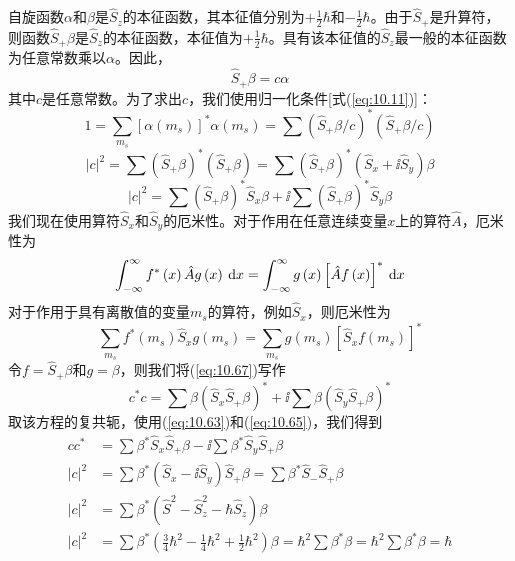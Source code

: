     自旋函数$\alpha$和$\beta$是$\hat{S}_z$的本征函数，其本征值分别为$+\frac{1}{2}\hbar$和$-\frac{1}{2}\hbar$。由于$\hat{S}_+$是升算符，则函数$\hat{S}_+\beta$是$\hat{S}_z$的本征函数，本征值为$+\frac{1}{2}\hbar$。具有该本征值的$\hat{S}_z$最一般的本征函数为任意常数乘以$\alpha$。因此，
    \begin{equation}
        \hat{S}_+\beta = c\alpha
        \label{eq:10.66}
    \end{equation}
    其中$c$是任意常数。为了求出$c$，我们使用归一化条件[式(\ref{eq:10.11})]：
    \begin{equation*}
        1 = \sum_{m_s} \left[\alpha\left(m_s\right)\right]^*\alpha\left(m_s\right) = \sum \left(\hat{S}_+\beta/c\right)^* \left(\hat{S}_+\beta/c\right)
    \end{equation*}
    \begin{equation*}
        \left|c\right|^2 = \sum \left(\hat{S}_+\beta\right) ^* \left(\hat{S}_+\beta\right) = \sum \left(\hat{S}_+\beta\right)^* \left(\hat{S}_x + \ii \hat{S}_y\right)\beta
    \end{equation*}
    \begin{equation}
        \left|c\right|^2 = \sum \left(\hat{S}_+\beta\right)^* \hat{S}_x\beta + \ii \sum \left(\hat{S}_+\beta\right)^* \hat{S}_y\beta
        \label{eq:10.67}
    \end{equation}
    我们现在使用算符$\hat{S}_x$和$\hat{S}_y$的厄米性。对于作用在任意连续变量$x$上的算符$\hat{A}$，厄米性为
    \begin{equation*}
        \int_{-\infty}^{\infty} f^*\left(x\right)\hat{A}g\left(x\right) \: \dd x = \int_{-\infty}^{\infty} g\left(x\right) \left[\hat{A}f\left(x\right)\right]^* \: \dd x
    \end{equation*}
    对于作用于具有离散值的变量$m_s$的算符，例如$\hat{S}_x$，则厄米性为
    \begin{equation}
        \sum_{m_s} f^*(m_s)\hat{S}_x g(m_s) = \sum_{m_s} g(m_s)\left[\hat{S}_x f(m_s)\right]^*
        \label{eq:10.68}
    \end{equation}
    令$f = \hat{S}_+\beta$和$g = \beta$，则我们将(\ref{eq:10.67})写作
    \begin{equation*}
        c ^* c = \sum \beta (\hat{S}_x\hat{S}_+ \beta) ^* + \ii \sum \beta (\hat{S}_y\hat{S}_+ \beta)^*
    \end{equation*}
    取该方程的复共轭，使用(\ref{eq:10.63})和(\ref{eq:10.65})，我们得到
    \begin{equation*}
        \begin{aligned}
            cc^* &= \sum \beta ^* \hat{S}_x\hat{S}_+ \beta - \ii \sum \beta ^* \hat{S}_y\hat{S}_+ \beta \\
            |c|^2 &= \sum \beta ^* \left(\hat{S}_x - \ii \hat{S}_y  \right)\hat{S}_+\beta = \sum \beta ^* \hat{S}_-\hat{S}_+\beta \\
            |c|^2 &= \sum \beta ^* \left(\hat{S}^2 - \hat{S}_z^2 - \hbar\hat{S}_z  \right)\beta \\
            |c|^2 &= \sum \beta ^* \left(\frac{3}{4}\hbar^2 -\frac{1}{4}\hbar^2 + \frac{1}{2}\hbar^2  \right)\beta = \hbar^2 \sum \beta ^* \beta = \hbar^2 \sum \beta^* \beta = \hbar
        \end{aligned}
    \end{equation*}
